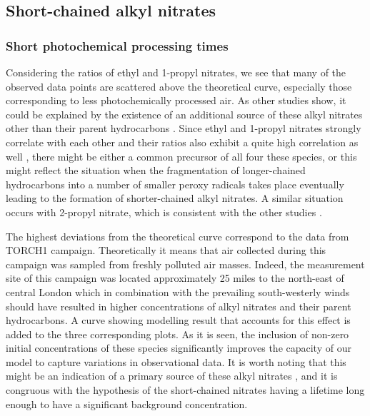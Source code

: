 \documentclass[11pt,a4paper]{article}
\begin{document}
\subsection{Short-chained alkyl nitrates} \label{sec:short_an}
\subsubsection{Short photochemical processing times} \label{sec:short_an_short_time}
Considering  the ratios of ethyl and 1-propyl nitrates, we see that many of the observed data points are scattered above the theoretical curve, especially those corresponding to less photochemically processed air. As other studies show, it could be explained by the existence of an additional source of these alkyl nitrates other than their parent hydrocarbons \citep{Bertman1995, Roberts1998, Stroud2001}. Since ethyl and 1-propyl nitrates strongly correlate with each other and their ratios also exhibit a quite high correlation as well \citep{Reeves2007},  there might be either a common precursor of all four these species, or this might reflect the situation when the fragmentation of longer-chained  hydrocarbons into a number of smaller peroxy radicals takes place eventually leading to the formation of shorter-chained alkyl nitrates. A similar situation occurs with 2-propyl nitrate, which is consistent with the other studies  \citep{Bertman1995, Roberts1998, Stroud2001, Simpson2003}.

The highest deviations from the theoretical curve correspond to the data from TORCH1 campaign. Theoretically it means that air collected during this campaign was sampled from freshly polluted air masses. Indeed, the measurement site of this campaign was located approximately 25 miles to the north-east of central London which in combination with the prevailing south-westerly winds should have resulted in higher concentrations of alkyl nitrates and their parent hydrocarbons. A curve showing modelling result that accounts for this effect is added to the three corresponding plots. As it is seen, the inclusion of non-zero initial concentrations of these species significantly improves the capacity of our model to capture variations in observational data. It is worth noting that this might be an indication of a primary source of these alkyl nitrates \citep{Bertman1995}, and it is congruous with the hypothesis of the short-chained nitrates having  a lifetime long enough to have a significant background concentration.
\end{document}
